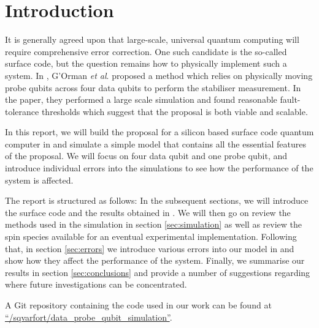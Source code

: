 \section{Introduction} \label{sec:Introduction}

It is generally agreed upon that large-scale, universal quantum computing will require comprehensive error correction. One such candidate is the so-called surface code, but the question remains how to physically implement such a system. In \cite{OGorman2016}, G'Orman \textit{et al}. proposed a method which relies on physically moving probe qubits across four data qubits to perform the stabiliser measurement. In the paper, they performed a large scale simulation and found reasonable fault-tolerance thresholds which suggest that the proposal is both viable and scalable. 

In this report, we will build the proposal for a silicon based surface code quantum computer in  \cite{OGorman2016} and simulate a simple model that contains all the essential features of the proposal. We will focus on four data qubit and one probe qubit, and introduce individual errors into the simulations to see how the performance of the system is affected. 

The report is structured as follows: In the subsequent sections, we will introduce the surface code and the results obtained in \citet{OGorman2016}. We will then go on review the methods used in the simulation in section \@ \ref{sec:simulation} as well as review the spin species available for an eventual experimental implementation. Following that, in section \@ \ref{sec:errors} we introduce various errors into our model in and show how they affect the performance of the system. Finally, we summarise our results in section \@ \ref{sec:conclusions} and provide a number of suggestions regarding where future investigations can be concentrated. 

A Git repository containing the code used in our work can be found at \href{https://github.com/sqvarfort/data_probe_qubit_simulation}{``/sqvarfort/data\_probe\_qubit\_simulation''}. 

